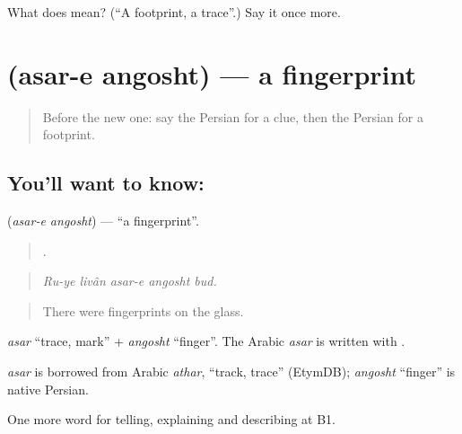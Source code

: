 \begin{tcolorbox}[breakable,colback=teal!4,colframe=teal!35!black,title={Before you move on}]
What does  mean? (\textquotedblleft{}A footprint, a trace\textquotedblright{}.) Say it once more.
\end{tcolorbox}
\section[\texorpdfstring{\fa{اثر} \fa{انگشت} (asar-e angosht)}{اثر انگشت (asar-e angosht)}]{  (asar-e angosht) — a fingerprint}

\label{lesson:FA-C320-asar-e-angosht}



\begin{quote}
Before the new one: say the Persian for a clue, then the Persian for a footprint.
\end{quote}

\subsection*{You'll want to know:  }
\textbf{ } (\emph{asar-e angosht}) — \textquotedblleft{}a fingerprint\textquotedblright{}.

\begin{quote}
    .
\end{quote}

\begin{quote}
\emph{Ru-ye livân asar-e angosht bud.}
\end{quote}

\begin{quote}
There were fingerprints on the glass.
\end{quote}

\emph{asar} \textquotedblleft{}trace, mark\textquotedblright{} + \emph{angosht} \textquotedblleft{}finger\textquotedblright{}. The Arabic \emph{asar} is written with .

\begin{cousinweb}
\emph{asar} is borrowed from Arabic \emph{athar}, \textquotedblleft{}track, trace\textquotedblright{} (EtymDB); \emph{angosht} \textquotedblleft{}finger\textquotedblright{} is native Persian.
\end{cousinweb}

\begin{grammarlens}[title={What you've built}]
One more word for telling, explaining and describing at B1.
\end{grammarlens}

